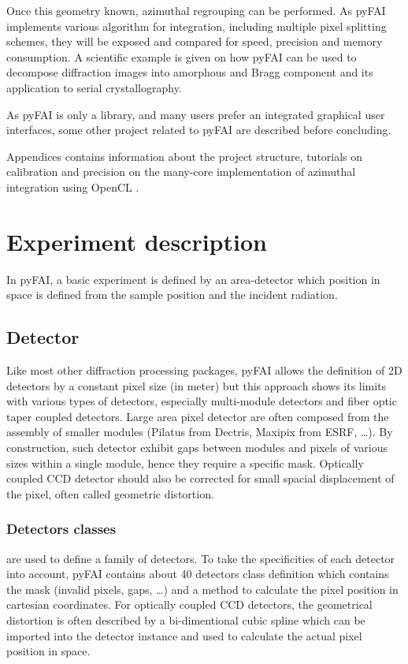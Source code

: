 \documentclass[preprint]{iucr}
\begin{document}
Once this geometry known, azimuthal regrouping can be performed. 
As pyFAI implements various algorithm for integration, including 
multiple pixel splitting schemes, they will be exposed and compared
for speed, precision and memory consumption.
A scientific example is given on how pyFAI can be used to decompose 
diffraction images into amorphous and Bragg component and its application
to serial crystallography.

As pyFAI is only a library, and many users prefer an integrated graphical user
interfaces, some other project related to pyFAI are described before concluding.

Appendices contains information about the project structure, tutorials on
calibration and precision on the many-core implementation of azimuthal
integration using OpenCL \cite{OpenCL}.
 
\section{Experiment description}
In pyFAI, a basic experiment is defined by an area-detector which position in
space is defined from the sample position and the incident radiation.

\subsection{Detector}
Like most other diffraction processing packages, pyFAI allows the definition of
2D detectors by a constant pixel size (in meter) but this approach shows its limits
with various types of detectors, especially multi-module detectors and fiber
optic taper coupled detectors. Large area pixel detector are often composed from
the assembly of smaller modules (Pilatus from Dectris, Maxipix from ESRF, \ldots). 
By construction, such detector exhibit gaps between modules and pixels of
various sizes within a single module, hence they require a specific mask.
Optically coupled CCD detector should also be corrected
for small spacial displacement of the pixel, often called geometric distortion.

\subsubsection{Detectors classes} are used to define a family of detectors. 
To take the specificities of each detector into account, pyFAI contains about
40 detectors class definition which contains the mask (invalid pixels, gaps,
\ldots) and a method to calculate the pixel position in cartesian coordinates.
For optically coupled CCD detectors, the geometrical distortion is often
described by a bi-dimentional cubic spline which can be imported into
the detector instance and used to calculate the actual pixel position in space.
\end{document}
